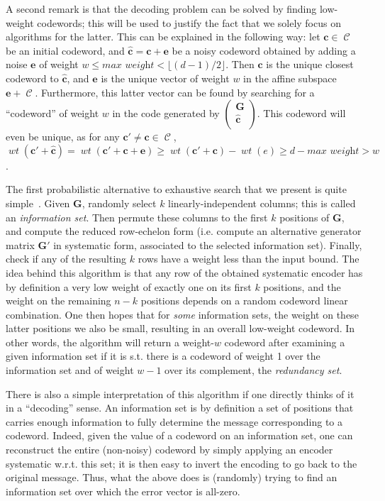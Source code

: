 \documentclass[11pt,a4paper]{article}
\theoremstyle{definition}
\DeclareMathOperator\code{\mathcal{C}}
\DeclareMathOperator\wt{\mathit{wt}}
\begin{document}
A second remark is that the decoding problem can be solved by finding low-weight codewords; this will be used to justify the fact that we solely focus on algorithms for the latter. This can be explained in the following way: let
$\bm{c} \in \code$ be an initial codeword, and $\bm{\hat{c}} = \bm{c} + \bm{e}$ be a noisy codeword obtained by adding a noise $\bm{e}$ of weight $w \leq  \textit{max weight} <
\lfloor(d-1)/2\rfloor$. Then $\bm{c}$
is the unique closest codeword to $\bm{\hat{c}}$, and $\bm{e}$ is the unique vector of weight $w$ in the affine subspace $\bm{e} + \code$. Furthermore, this latter vector can be found by searching for a ``codeword'' of weight
$w$ in the code generated by $\begin{pmatrix}\bm{G}\\ \bm{\hat{c}}\\ \end{pmatrix}$. This codeword will even be unique, as for any $\bm{c}' \neq \bm{c} \in \code$, $\wt(\bm{c}' + \bm{\hat{c}}) = \wt(\bm{c}' + \bm{c} + \bm{e})
	\geq \wt(\bm{c}' + \bm{c}) - \wt(e) \geq d - \textit{max weight} > w$.

\medskip

The first probabilistic alternative to exhaustive search that we present is quite simple~\cite{Prange,McEliece}. Given $\bm{G}$, randomly select $k$ linearly-independent columns; this is called an \emph{information set}. Then permute these columns
to the first $k$ positions of $\bm{G}$, and compute the reduced row-echelon form (i.e. compute an alternative generator matrix $\bm{G}'$ in systematic form, associated to the selected information set).
Finally, check if any of the resulting $k$ rows have a weight less than the input bound. The idea behind this algorithm is that any row of the obtained systematic encoder has by definition a very low weight of exactly one on its first $k$ positions,
and the weight on the remaining $n-k$ positions depends on a random codeword linear combination. One then hopes that for \emph{some} information sets, the weight on these latter positions we also be small, resulting in an overall low-weight codeword.
In other words, the algorithm will return a weight-$w$ codeword after examining a given information set if it is s.t. there is a codeword of weight 1 over the information set and of weight
$w - 1$ over its complement, the \emph{redundancy set}.

There is also a simple interpretation of this algorithm if one directly thinks of it in a ``decoding'' sense. An information set is by definition a set of positions that carries enough information to fully determine the message corresponding to a codeword.
Indeed, given the value of a codeword on an information set, one can reconstruct the entire (non-noisy) codeword by simply applying an encoder systematic w.r.t. this set;
it is then easy to invert the encoding to go back to the original message.
Thus, what the above does is (randomly) trying to find an information set over which the error vector is all-zero.
\end{document}
